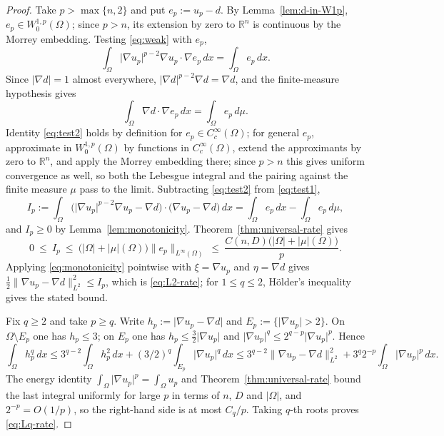 \documentclass[11pt]{article}
\newcommand{\R}{\mathbb R}
\newcommand{\abs}[1]{\lvert #1\rvert}
\newcommand{\norm}[1]{\lVert #1\rVert}
\theoremstyle{definition}
\theoremstyle{remark}
\begin{document}
\begin{proof}
Take $p>\max\{n,2\}$ and put $e_p:=u_p-d$. By Lemma~\ref{lem:d-in-W1p},
$e_p\in W^{1,p}_0(\Omega)$; since $p>n$, its extension by zero to $\R^n$ is
continuous by the Morrey embedding. Testing \eqref{eq:weak} with $e_p$,
\begin{equation}\label{eq:test1}
\int_\Omega\abs{\nabla u_p}^{p-2}\nabla u_p\cdot\nabla e_p\,dx
=\int_\Omega e_p\,dx.
\end{equation}
Since $\abs{\nabla d}=1$ almost everywhere,
$\abs{\nabla d}^{p-2}\nabla d=\nabla d$, and the finite-measure hypothesis
gives
\begin{equation}\label{eq:test2}
\int_\Omega\nabla d\cdot\nabla e_p\,dx=\int_\Omega e_p\,d\mu .
\end{equation}
Identity \eqref{eq:test2} holds by definition for $e_p\in C_c^\infty(\Omega)$;
for general $e_p$, approximate in $W^{1,p}_0(\Omega)$ by functions in
$C_c^\infty(\Omega)$, extend the approximants by zero to $\R^n$, and apply the
Morrey embedding there; since $p>n$ this gives uniform convergence as well, so
both the Lebesgue integral and the pairing against the finite measure $\mu$
pass to the limit. Subtracting \eqref{eq:test2} from \eqref{eq:test1},
\[
I_p:=\int_\Omega
\bigl(\abs{\nabla u_p}^{p-2}\nabla u_p-\nabla d\bigr)\cdot
\bigl(\nabla u_p-\nabla d\bigr)\,dx
=\int_\Omega e_p\,dx-\int_\Omega e_p\,d\mu ,
\]
and $I_p\ge0$ by Lemma~\ref{lem:monotonicity}. Theorem~\ref{thm:universal-rate}
gives
\[
0\ \le\ I_p\ \le\ \bigl(\abs{\Omega}+\abs{\mu}(\Omega)\bigr)
\norm{e_p}_{L^\infty(\Omega)}\ \le\ \frac{C(n,D)\bigl(\abs{\Omega}+\abs{\mu}(\Omega)\bigr)}{p}.
\]
Applying \eqref{eq:monotonicity} pointwise with $\xi=\nabla u_p$ and
$\eta=\nabla d$ gives $\tfrac12\norm{\nabla u_p-\nabla d}_{L^2}^2\le I_p$,
which is \eqref{eq:L2-rate}; for $1\le q\le2$, H\"older's inequality gives
the stated bound.

Fix $q\ge2$ and take $p\ge q$. Write $h_p:=\abs{\nabla u_p-\nabla d}$ and
$E_p:=\{\abs{\nabla u_p}>2\}$. On $\Omega\setminus E_p$ one has $h_p\le3$;
on $E_p$ one has $h_p\le\tfrac32\abs{\nabla u_p}$ and
$\abs{\nabla u_p}^q\le2^{q-p}\abs{\nabla u_p}^p$. Hence
\[
\int_\Omega h_p^q\,dx
\le 3^{q-2}\int_\Omega h_p^2\,dx
 +(3/2)^q\int_{E_p}\abs{\nabla u_p}^q\,dx
\le 3^{q-2}\norm{\nabla u_p-\nabla d}_{L^2}^2
 +3^q2^{-p}\int_\Omega\abs{\nabla u_p}^p\,dx.
\]
The energy identity $\int_\Omega\abs{\nabla u_p}^p=\int_\Omega u_p$ and
Theorem~\ref{thm:universal-rate} bound the last integral uniformly for large
$p$ in terms of $n$, $D$ and $\abs\Omega$, and $2^{-p}=O(1/p)$, so the
right-hand side is at most $C_q/p$. Taking $q$-th roots proves
\eqref{eq:Lq-rate}.
\end{proof}
\end{document}
